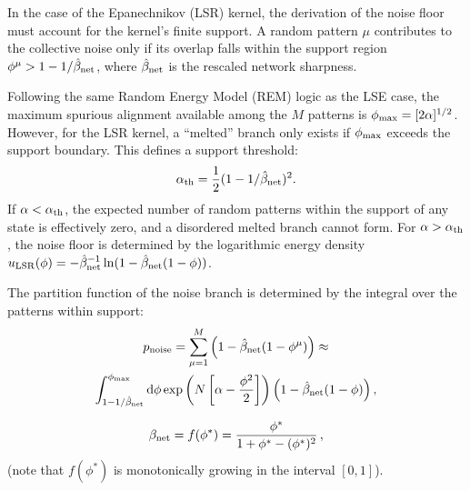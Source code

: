 \documentclass{article}
\newcommand{\dd}{{\mathrm{d}}}
\theoremstyle{plain}
\theoremstyle{definition}
\theoremstyle{remark}
\begin{document}
In the case of the Epanechnikov (LSR) kernel, the derivation of the noise floor must account for the kernel's finite support. A random pattern $\mu$ contributes to the collective noise only if its overlap falls within the support region $\phi^\mu > 1 - 1/\hat\beta_{\rm net}$, where $\hat\beta_{\rm net}$ is the rescaled network sharpness.

Following the same Random Energy Model (REM) logic as the LSE case, the maximum spurious alignment available among the $M$ patterns is $\phi_{\rm max} = [2\alpha]^{1/2}$. However, for the LSR kernel, a ``melted'' branch only exists if $\phi_{\rm max}$ exceeds the support boundary. This defines a support threshold:
\begin{equation}
    \alpha_{\rm th} = \frac{1}{2} (1 - 1/\hat\beta_{\rm net})^2 .
    \label{eq:alpha_th}
\end{equation}
If $\alpha < \alpha_{\rm th}$, the expected number of random patterns within the support of any state is effectively zero, and a disordered melted branch cannot form. For $\alpha > \alpha_{\rm th}$, the noise floor is determined by the logarithmic energy density $u_{\rm LSR}(\phi) = -\hat\beta_{\rm net}^{-1} \ln ( 1 - \hat\beta_{\rm net}(1 - \phi) )$.

The partition function of the noise branch is determined by the integral over the patterns within support:
\begin{multline}
    p_{\rm noise} = \sum_{\mu=1}^{M} \left( 1 - \hat\beta_{\rm net} (1 - \phi^\mu) \right) \approx \\
    \int_{1-1/\hat\beta_{\rm net}}^{\phi_{\rm max}} \dd\phi \exp\left( N \left[ \alpha - \frac{\phi^2}{2} \right] \right) \left( 1 - \hat\beta_{\rm net} (1 - \phi) \right),
\end{multline}

\begin{equation}
    \beta_{\rm net} = f(\phi^*) = \frac{\phi^*}{1 + \phi^* - (\phi^*)^2}\,,
\end{equation}
(note that $f(\phi^*)$ is monotonically growing in the interval $[0,1]$).
\end{document}
